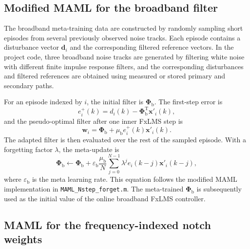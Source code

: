 \documentclass{internoise2026}
\begin{document}
\subsection{Modified MAML for the broadband filter}

The broadband meta-training data are constructed by randomly sampling short episodes from several previously observed noise tracks. Each episode contains a disturbance vector $\mathbf{d}_i$ and the corresponding filtered reference vectors. In the project code, three broadband noise tracks are generated by filtering white noise with different finite impulse response filters, and the corresponding disturbances and filtered references are obtained using measured or stored primary and secondary paths.

For an episode indexed by $i$, the initial filter is $\boldsymbol{\Phi}_{\mathrm{b}}$. The first-step error is
\begin{equation}
  e_i^{+}(k)=d_i(k)-\boldsymbol{\Phi}_{\mathrm{b}}^{\mathrm{T}}\mathbf{x}'_i(k),
  \label{eq:maml_first_error}
\end{equation}
and the pseudo-optimal filter after one inner FxLMS step is
\begin{equation}
  \mathbf{w}_i =
  \boldsymbol{\Phi}_{\mathrm{b}}
  + \mu_{\mathrm{b}} e_i^{+}(k)\mathbf{x}'_i(k).
  \label{eq:maml_inner}
\end{equation}
The adapted filter is then evaluated over the rest of the sampled episode. With a forgetting factor $\lambda$, the meta-update is
\begin{equation}
  \boldsymbol{\Phi}_{\mathrm{b}}
  \leftarrow
  \boldsymbol{\Phi}_{\mathrm{b}}
  + \varepsilon_{\mathrm{b}}
  \frac{\mu_{\mathrm{b}}}{N}
  \sum_{j=0}^{N-1}
  \lambda^{j} e_i(k-j)\mathbf{x}'_i(k-j),
  \label{eq:broadband_meta_update}
\end{equation}
where $\varepsilon_{\mathrm{b}}$ is the meta learning rate. This equation follows the modified MAML implementation in \texttt{MAML\_Nstep\_forget.m}. The meta-trained $\boldsymbol{\Phi}_{\mathrm{b}}$ is subsequently used as the initial value of the online broadband FxLMS controller.

\subsection{MAML for the frequency-indexed notch weights}
\end{document}
